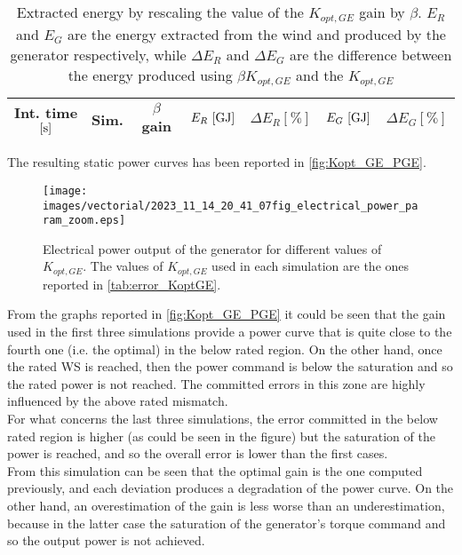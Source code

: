 \begin{table}[htb]
  \caption{Extracted energy by rescaling the value of the $K_{opt,GE}$ gain by $\beta$. $E_R$ and $E_G$ are the energy extracted from the wind and produced by the generator respectively, while $\Delta E_R$ and $\Delta E_G$ are the difference between the energy produced using $\beta K_{opt,GE}$ and the $K_{opt,GE}$}
  \centering
  \begin{tabular}{ccccccc}
  \toprule
  Int. time $\left[\si{\second}\right]$ & Sim. & $\beta$ gain & $E_R \, \left[\si{\giga\joule}\right]$ & $\Delta E_R \left[\%\right]$ & $E_G \, \left[\si{\giga\joule}\right]$ & $\Delta E_G \left[\%\right]$\\ 
   \midrule
  
  \end{tabular}
  \label{tab:error_KoptGE}
\end{table}

The resulting static power curves has been reported in \autoref{fig:Kopt_GE_PGE}.
\begin{figure}
  \centering
  \texttt{[image: images/vectorial/2023\_11\_14\_20\_41\_07fig\_electrical\_power\_param\_zoom.eps]}
  \caption{Electrical power output of the generator for different values of $K_{opt,GE}$. The values of $K_{opt,GE}$ used in each simulation are the ones reported in \autoref{tab:error_KoptGE}.}
  \label{fig:Kopt_GE_PGE}
\end{figure}

From the graphs reported in \autoref{fig:Kopt_GE_PGE} it could be seen that the gain used in the first three simulations provide a power curve that is quite close to the fourth one (i.e. the optimal) in the below rated region. On the other hand, once the rated WS is reached, then the power command is below the saturation and so the rated power is not reached. The committed errors in this zone are highly influenced by the above rated mismatch. \\
For what concerns the last three simulations, the error committed in the below rated region is higher (as could be seen in the figure) but the saturation of the power is reached, and so the overall error is lower than the first cases. \\
From this simulation can be seen that the optimal gain is the one computed previously, and each deviation produces a degradation of the power curve. On the other hand, an overestimation of the gain is less worse than an underestimation, because in the latter case the saturation of the generator's torque command and so the output power is not achieved.

\newpage